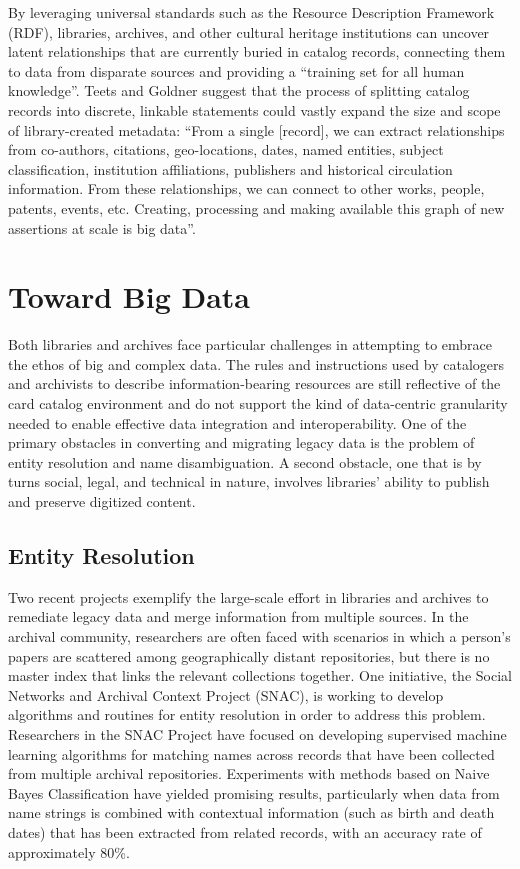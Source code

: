 \documentclass[sigconf]{acmart}
\begin{document}
By leveraging universal standards such as the Resource Description Framework (RDF), libraries, archives, and other cultural heritage institutions can uncover latent relationships that are currently buried in catalog records, connecting them to data from disparate sources and providing a ``training set for all human knowledge''\cite[p.~430]{mT13}. Teets and Goldner suggest that the process of splitting catalog records into discrete, linkable statements could vastly expand the size and scope of library-created metadata: ``From a single [record], we can extract relationships from co-authors, citations, geo-locations, dates, named entities, subject classification, institution affiliations, publishers and historical circulation information. From these relationships, we can connect to other works, people, patents, events, etc. Creating, processing and making available this graph of new assertions at scale is big data''\cite[p.~431]{mT13}.

\section{Toward Big Data}
Both libraries and archives face particular challenges in attempting to embrace the ethos of big and complex data. The rules and instructions used by catalogers and archivists to describe information-bearing resources are still reflective of the card catalog environment and do not support the kind of data-centric granularity needed to enable effective data integration and interoperability\cite{rT02}. One of the primary obstacles in converting and migrating legacy data is the problem of entity resolution and name disambiguation. A second obstacle, one that is by turns social, legal, and technical in nature, involves libraries' ability to publish and preserve digitized content.

\subsection{Entity Resolution}
Two recent projects exemplify the large-scale effort in libraries and archives to remediate legacy data and merge information from multiple sources. In the archival community, researchers are often faced with scenarios in which a person's papers are scattered among geographically distant repositories, but there is no master index that links the relevant collections together. One initiative, the Social Networks and Archival Context Project (SNAC), is working to develop algorithms and routines for entity resolution in order to address this problem. Researchers in the SNAC Project have focused on developing supervised machine learning algorithms for matching names across records that have been collected from multiple archival repositories\cite{rL11}. Experiments with methods based on Naive Bayes Classification have yielded promising results, particularly when data from name strings is combined with contextual information (such as birth and death dates) that has been extracted from related records, with an accuracy rate of approximately 80\%\cite{rL11}.
\end{document}
